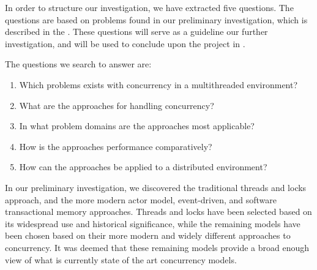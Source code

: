 \makeatletter {}\makeatother
{}
%
In order to structure our investigation, we have extracted five questions. The questions are based on problems found in our preliminary investigation, which is described in the . These questions will serve as a guideline our further investigation, and will be used to conclude upon the project in .

The questions we search to answer are:
\begin{enumerate}
\item Which problems exists with concurrency in a multithreaded environment? 
\item What are the approaches for handling concurrency?
\item In what problem domains are the approaches most applicable?
\item How is the approaches performance comparatively?
\item How can the approaches be applied to a distributed environment?
\end{enumerate}

In our preliminary investigation, we discovered the traditional threads and locks approach, and the more modern actor model, event-driven, and software transactional memory approaches. Threads and locks have been selected based on its widespread use and historical significance, while the remaining models have been chosen based on their more modern and widely different approaches to concurrency. It was deemed that these remaining models provide a broad enough view of what is currently state of the art concurrency models. 

\worksheetend